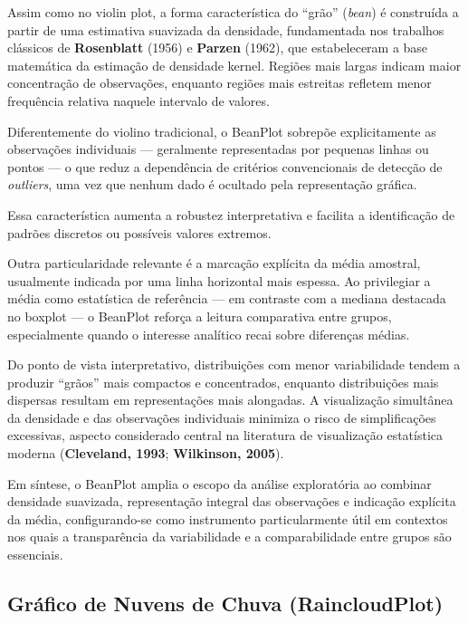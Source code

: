 Assim como no violin plot, a forma característica do ``grão'' (\textit{bean}) é construída a partir de uma estimativa suavizada da densidade, fundamentada nos trabalhos clássicos de \textbf{Rosenblatt} (1956) e \textbf{Parzen} (1962), que estabeleceram a base matemática da estimação de densidade kernel. Regiões mais largas indicam maior concentração de observações, enquanto regiões mais estreitas refletem menor frequência relativa naquele intervalo de valores. \vskip0.3cm

Diferentemente do violino tradicional, o BeanPlot sobrepõe explicitamente as observações individuais — geralmente representadas por pequenas linhas ou pontos — o que reduz a dependência de critérios convencionais de detecção de \textit{outliers}, uma vez que nenhum dado é ocultado pela representação gráfica. 
\newpage

Essa característica aumenta a robustez interpretativa e facilita a identificação de padrões discretos ou possíveis valores extremos.  \vskip0.3cm

Outra particularidade relevante é a marcação explícita da média amostral, usualmente indicada por uma linha horizontal mais espessa. Ao privilegiar a média como estatística de referência — em contraste com a mediana destacada no boxplot — o BeanPlot reforça a leitura comparativa entre grupos, especialmente quando o interesse analítico recai sobre diferenças médias. \vskip0.3cm

Do ponto de vista interpretativo, distribuições com menor variabilidade tendem a produzir ``grãos'' mais compactos e concentrados, enquanto distribuições mais dispersas resultam em representações mais alongadas. A visualização simultânea da densidade e das observações individuais minimiza o risco de simplificações excessivas, aspecto considerado central na literatura de visualização estatística moderna (\textbf{Cleveland, 1993}; \textbf{Wilkinson, 2005}). \vskip0.3cm

Em síntese, o BeanPlot amplia o escopo da análise exploratória ao combinar densidade suavizada, representação integral das observações e indicação explícita da média, configurando-se como instrumento particularmente útil em contextos nos quais a transparência da variabilidade e a comparabilidade entre grupos são essenciais.

\subsection{Gráfico de Nuvens de Chuva (RaincloudPlot)}

